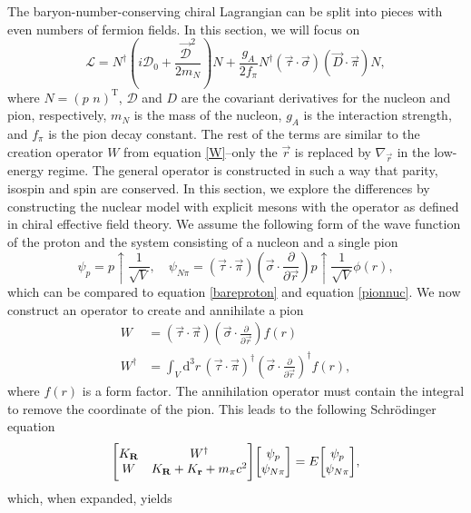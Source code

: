 The baryon-number-conserving chiral Lagrangian can be split into pieces with even numbers of fermion fields. In this section, we will focus on 
\begin{equation}
	\mathcal{L} = N^\dagger \left(i\mathcal{D}_0+\frac{\vec{\mathcal{D}}^2}{2m_N} \right)N+\frac{g_A}{2f_\pi}N^\dagger(\vec{\tau}\cdot \vec{\sigma})(\vec{D}\cdot\vec{\pi})N,
\end{equation}
where $N= (p \, \,  n)^\mathrm{T}$, $\mathcal{D}$ and $D$ are the covariant derivatives for the nucleon and pion, respectively, $m_N$ is the mass of the nucleon, $g_A$ is the interaction strength, and $f_\pi$ is the pion decay constant. The rest of the terms are similar to the creation operator $W$ from equation \eqref{W}--only the $\vec{r}$ is replaced by $\nabla_{\vec{r}}$ in the low-energy regime. The general operator is constructed in such a way that parity, isospin and spin are conserved. In this section, we explore the differences by constructing the nuclear model with explicit mesons with the operator as defined in chiral effective field theory. We assume the following form of the wave function of the proton and the system consisting of a nucleon and a single pion
\begin{equation}\label{EFT1}
	\psi_p = p\uparrow\frac{1}{\sqrt{V}}, \quad \psi_{N\pi} = (\vec{\tau}\cdot \vec{\pi})(\vec{\sigma}\cdot \frac{\partial}{\partial\vec{r}})p\uparrow \frac{1}{\sqrt{V}}\phi(r),
\end{equation}
which can be compared to equation \eqref{bareproton} and equation \eqref{pionnuc}. We now construct an operator to create and annihilate a pion
\begin{align}\label{EFT2}
	W & = (\vec{\tau}\cdot \vec{\pi})(\vec{\sigma}\cdot \frac{\partial}{\partial\vec{r}})f(r) \\
	W^\dagger & = \int_V \text{d}^3 r \, (\vec{\tau}\cdot \vec{\pi})^\dagger(\vec{\sigma}\cdot \frac{\partial}{\partial\vec{r}})^\dagger f(r), \label{EFT3}
\end{align}
where $f(r)$ is a form factor. The annihilation operator must contain the integral to remove the coordinate of the pion. This leads to the following Schrödinger equation
\begin{equation}
	\mqty[K_{\vec{R}} & W^\dagger \\ W & K_{\vec{R}}+K_{\vec{r}}+m_\pi c^2]\mqty[\psi_p \\ \psi_{N\pi}]=E\mqty[\psi_p \\ \psi_{N\pi}],
\end{equation}
which, when expanded, yields
